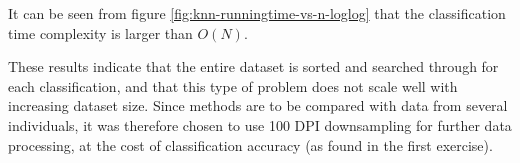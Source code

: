 It can be seen from figure \ref{fig:knn-runningtime-vs-n-loglog} that
the classification time complexity is larger than \(O(N)\).

These results indicate that the entire dataset is sorted and searched through for
each classification, and that this type of problem does not scale well with increasing
dataset size.
Since methods are to be compared with data from several individuals,
it was therefore chosen to use 100 DPI downsampling for further data processing,
at the cost of classification accuracy (as found in the first exercise).
